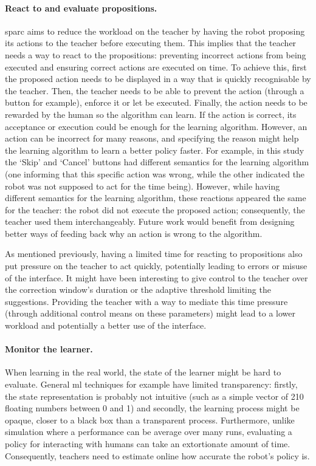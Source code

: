 \paragraph{React to and evaluate propositions.} 
\gls{sparc} aims to reduce the workload on the teacher by having the robot proposing its actions to the teacher before executing them. This implies that the teacher needs a way to react to the propositions: preventing incorrect actions from being executed and ensuring correct actions are executed on time. To achieve this, first the proposed action needs to be displayed in a way that is quickly recognisable by the teacher. Then, the teacher needs to be able to prevent the action (through a button for example), enforce it or let be executed. Finally, the action needs to be rewarded by the human so the algorithm can learn. If the action is correct, its acceptance or execution could be enough for the learning algorithm. However, an action can be incorrect for many reasons, and specifying the reason might help the learning algorithm to learn a better policy faster. For example, in this study the `Skip' and `Cancel' buttons had different semantics for the learning algorithm (one informing that this specific action was wrong, while the other indicated the robot was not supposed to act for the time being). However, while having different semantics for the learning algorithm, these reactions appeared the same for the teacher: the robot did not execute the proposed action; consequently, the teacher used them interchangeably. Future work would benefit from designing better ways of feeding back why an action is wrong to the algorithm.

As mentioned previously, having a limited time for reacting to propositions also put pressure on the teacher to act quickly, potentially leading to errors or misuse of the interface. It might have been interesting to give control to the teacher over the correction window's duration or the adaptive threshold limiting the suggestions. Providing the teacher with a way to mediate this time pressure (through additional control means on these parameters) might lead to a lower workload and potentially a better use of the interface. 

\paragraph{Monitor the learner.}
When learning in the real world, the state of the learner might be hard to evaluate. General \gls{ml} techniques for example have limited transparency: firstly, the state representation is probably not intuitive (such as a simple vector of 210 floating numbers between 0 and 1) and secondly, the learning process might be opaque, closer to a black box than a transparent process. Furthermore, unlike simulation where a performance can be average over many runs, evaluating a policy for interacting with humans can take an extortionate amount of time. Consequently, teachers need to estimate online how accurate the robot's policy is. 

